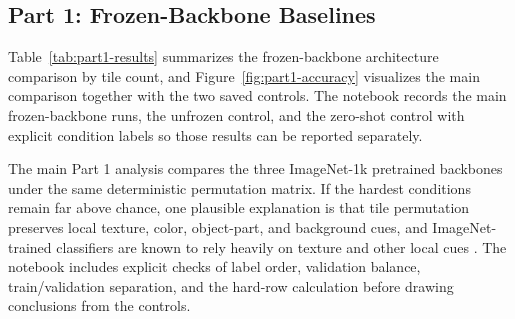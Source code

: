 \documentclass[12pt]{article}
\newcommand{\reporttablesize}{\small}
\begin{document}
\subsection{Part 1: Frozen-Backbone Baselines}
\label{sec:part1-results}

\begin{table}[!t]
  \centering
  \reporttablesize
  \caption{Main Part 1 frozen-backbone results by model family and tile count. Each entry reports mean best validation accuracy over the three deterministic difficulty labels at that tile count; values in parentheses are standard deviations in percentage points across those labels from \texttt{part1\_aggregated\_results.csv}. These are validation-set summaries, not independent test-set estimates or confidence intervals.}
  \label{tab:part1-results}
\end{table}

Table~\ref{tab:part1-results} summarizes the frozen-backbone architecture comparison by tile count, and Figure~\ref{fig:part1-accuracy} visualizes the main comparison together with the two saved controls. The notebook records the main frozen-backbone runs, the unfrozen control, and the zero-shot control with explicit condition labels so those results can be reported separately.

The main Part 1 analysis compares the three ImageNet-1k pretrained backbones under the same deterministic permutation matrix. If the hardest conditions remain far above chance, one plausible explanation is that tile permutation preserves local texture, color, object-part, and background cues, and ImageNet-trained classifiers are known to rely heavily on texture and other local cues \citep{geirhos2019imagenet,hermann2020origins}. The notebook includes explicit checks of label order, validation balance, train/validation separation, and the hard-row calculation before drawing conclusions from the controls.
\end{document}
